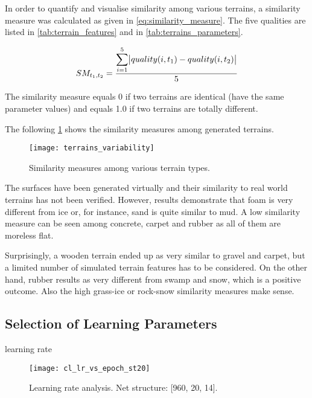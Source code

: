 In order to quantify and visualise similarity among various terrains, a similarity measure was calculated as given in \cref{eq:similarity_measure}. The five qualities are listed in \cref{tab:terrain_features} and in \cref{tab:terrains_parameters}.

\begin{align} \label{eq:similarity_measure}
  SM_{t_1, t_2} = \frac{\displaystyle\sum_{i=1}^{5} \abs{quality(i, t_1) - quality(i, t_2)}}{5}
\end{align} 

The similarity measure equals 0 if two terrains are identical (have the same parameter values) and equals 1.0 if two terrains are totally different.

The following \cref{fig:terrain_similarity_measures} shows the similarity measures among generated terrains.

\begin{figure}[H]
  \centering
  \texttt{[image: terrains\_variability]}
  \caption{Similarity measures among various terrain types.}
  \label{fig:terrain_similarity_measures}
\end{figure}

The surfaces have been generated virtually and their similarity to real world terrains has not been verified. However, results demonstrate that foam is very different from ice or, for instance, sand is quite similar to mud. A low similarity measure can be seen among concrete, carpet and rubber as all of them are moreless flat.

Surprisingly, a wooden terrain ended up as very similar to gravel and carpet, but a limited number of simulated terrain features has to be considered. 
On the other hand, rubber results as very different from swamp and snow, which is a positive outcome. Also the high grass-ice or rock-snow similarity measures make sense. 

\subsection{Selection of Learning Parameters} \label{ssec:analysis_of_learning_parameters}

learning rate

\begin{figure}[H]
  \centering
  \texttt{[image: cl\_lr\_vs\_epoch\_st20]}
  \caption{Learning rate analysis. Net structure: [960, 20, 14].}
  \label{fig:lr_analysis}
\end{figure}

